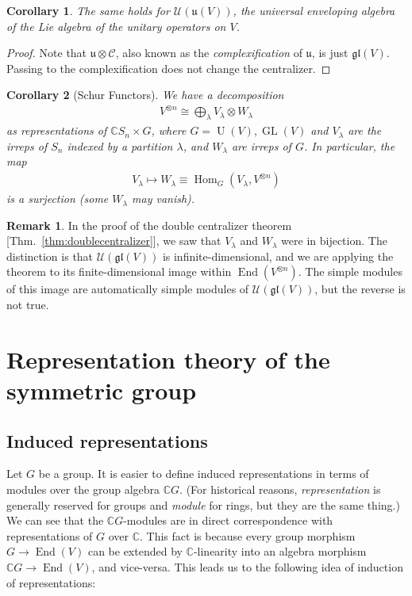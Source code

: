 \documentclass[11pt]{article}
\newtheorem{cor}{Corollary}
\theoremstyle{definition}
\newtheorem{rmk}{Remark}
\newcommand{\End}{\operatorname{End}}
\newcommand{\C}{\mathbb C}
\newcommand{\Hom}{\operatorname{Hom}}
\newcommand{\GL}{\operatorname{GL}}
\newcommand{\U}{\operatorname{U}}
\begin{document}
\begin{cor}
  The same holds for $\mathcal U(\mathfrak{u}(V))$, the universal enveloping
  algebra of the Lie algebra of the unitary operators on $V$.
\end{cor}

\begin{proof}
  Note that $\mathfrak{u}\otimes \mathcal C$, also known as the
  \textit{complexification} of $\mathfrak{u}$, is just $\mathfrak{gl}(V)$.
  Passing to the complexification does not change the centralizer.
\end{proof}

\begin{cor}[Schur Functors]
  We have a decomposition
  \begin{align}
V^{\otimes n} \cong \bigoplus_{\lambda} V_{\lambda} \otimes W_\lambda
  \end{align}
  as representations of $\C S_n \times G$, where $G = \U(V), \GL(V)$ and
  $V_\lambda$ are the irreps of $S_n$ indexed by a partition $\lambda$, and $W_\lambda$ are irreps of $G$. In
  particular, the map
  \begin{align}
    V_\lambda \mapsto W_\lambda \equiv \Hom_{G}(V_\lambda, V^{\otimes n})
  \end{align}
  is a surjection (some $W_\lambda$ may vanish).
\end{cor}
\begin{rmk}
In the proof of the double centralizer theorem
[Thm.~\ref{thm:doublecentralizer}], we saw that $V_\lambda$ and $W_\lambda$ were
in bijection. The distinction is that $\mathcal U(\mathfrak{gl}(V))$  is
infinite-dimensional, and we are applying the theorem to its finite-dimensional
image within $\End(V^{\otimes n})$. The simple modules of this image are
automatically simple modules of $\mathcal U(\mathfrak{gl}(V))$, but the reverse
is not true.
\end{rmk}

\section{Representation theory of the symmetric group}

\subsection{Induced representations}
Let $G$ be a group. It is easier to define induced representations in terms of modules over the
group algebra $\C G$. (For historical reasons, \textit{representation} is
generally reserved for groups and \textit{module} for rings, but they are the
same thing.)
We can see that the $\C G$-modules are in direct correspondence with
representations of $G$ over $\C$.
This fact is because every group morphism $G \to \End(V)$ can be extended by $\C$-linearity into an algebra morphism $\C G \to \End(V)$, and vice-versa. This leads us to the following idea of induction of representations:
\end{document}

